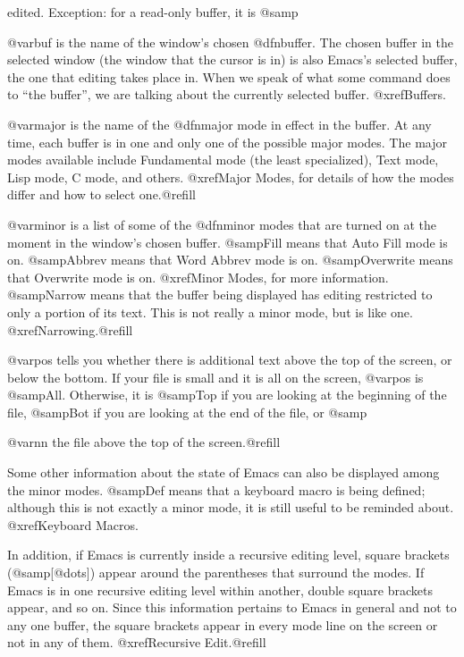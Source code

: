 edited.  Exception: for a read-only buffer, it is @samp{%

  @var{buf} is the name of the window's chosen @dfn{buffer}.  The chosen buffer
in the selected window (the window that the cursor is in) is also Emacs's
selected buffer, the one that editing takes place in.  When we speak of
what some command does to ``the buffer'', we are talking about the
currently selected buffer.  @xref{Buffers}.

  @var{major} is the name of the @dfn{major mode} in effect in the buffer.  At
any time, each buffer is in one and only one of the possible major modes.
The major modes available include Fundamental mode (the least specialized),
Text mode, Lisp mode, C mode, and others.  @xref{Major Modes}, for details
of how the modes differ and how to select one.@refill

  @var{minor} is a list of some of the @dfn{minor modes} that are turned on
at the moment in the window's chosen buffer.  @samp{Fill} means that Auto
Fill mode is on.  @samp{Abbrev} means that Word Abbrev mode is on.
@samp{Overwrite} means that Overwrite mode is on.  @xref{Minor Modes}, for
more information.  @samp{Narrow} means that the buffer being displayed has
editing restricted to only a portion of its text.  This is not really a
minor mode, but is like one.  @xref{Narrowing}.@refill

  @var{pos} tells you whether there is additional text above the top of the
screen, or below the bottom.  If your file is small and it is all on the
screen, @var{pos} is @samp{All}.  Otherwise, it is @samp{Top} if you are
looking at the beginning of the file, @samp{Bot} if you are looking at the
end of the file, or @samp{@var{nn}%
the file above the top of the screen.@refill

  Some other information about the state of Emacs can also be displayed
among the minor modes.  @samp{Def} means that a keyboard macro is being
defined; although this is not exactly a minor mode, it is still useful to
be reminded about.  @xref{Keyboard Macros}.

  In addition, if Emacs is currently inside a recursive editing level,
square brackets (@samp{[@dots{}]}) appear around the parentheses that
surround the modes.  If Emacs is in one recursive editing level within
another, double square brackets appear, and so on.  Since this information
pertains to Emacs in general and not to any one buffer, the square brackets
appear in every mode line on the screen or not in any of them.
@xref{Recursive Edit}.@refill

}}
